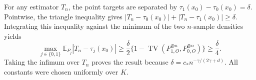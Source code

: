 For any estimator \(T_n\), the point targets are separated by
\(\tau_1(x_0)-\tau_0(x_0)=\delta\).  Pointwise, the triangle inequality gives
\(|T_n-\tau_0(x_0)|+|T_n-\tau_1(x_0)|\geq\delta\).  Integrating this inequality
against the minimum of the two \(n\)-sample densities yields
\[
\max_{j\in\{0,1\}}\mathbb E_{P_j}|T_n-\tau_j(x_0)|
\geq\frac{\delta}{2}\{1-\operatorname{TV}(P_{1,O}^{\otimes n},P_{0,O}^{\otimes n})\}
\geq\frac{\delta}{4}.
\]
Taking the infimum over \(T_n\) proves the result because
\(\delta=c_*n^{-\gamma/(2\gamma+d)}\).  All constants were chosen uniformly
over \(K\).
